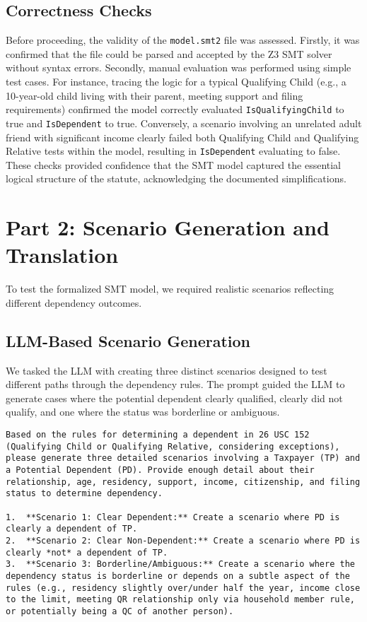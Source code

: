 \documentclass[11pt, letterpaper]{article}
\begin{document}
\subsection{Correctness Checks}
Before proceeding, the validity of the \texttt{model.smt2} file was assessed. Firstly, it was confirmed that the file could be parsed and accepted by the Z3 SMT solver without syntax errors. Secondly, manual evaluation was performed using simple test cases. For instance, tracing the logic for a typical Qualifying Child (e.g., a 10-year-old child living with their parent, meeting support and filing requirements) confirmed the model correctly evaluated \texttt{IsQualifyingChild} to true and \texttt{IsDependent} to true. Conversely, a scenario involving an unrelated adult friend with significant income clearly failed both Qualifying Child and Qualifying Relative tests within the model, resulting in \texttt{IsDependent} evaluating to false. These checks provided confidence that the SMT model captured the essential logical structure of the statute, acknowledging the documented simplifications.

\section{Part 2: Scenario Generation and Translation}

To test the formalized SMT model, we required realistic scenarios reflecting different dependency outcomes.

\subsection{LLM-Based Scenario Generation}

We tasked the LLM with creating three distinct scenarios designed to test different paths through the dependency rules. The prompt guided the LLM to generate cases where the potential dependent clearly qualified, clearly did not qualify, and one where the status was borderline or ambiguous.

\begin{lstlisting}[style=promptstyle, caption={LLM Prompt for Generating Test Scenarios}]
Based on the rules for determining a dependent in 26 USC 152 (Qualifying Child or Qualifying Relative, considering exceptions), please generate three detailed scenarios involving a Taxpayer (TP) and a Potential Dependent (PD). Provide enough detail about their relationship, age, residency, support, income, citizenship, and filing status to determine dependency.

1.  **Scenario 1: Clear Dependent:** Create a scenario where PD is clearly a dependent of TP.
2.  **Scenario 2: Clear Non-Dependent:** Create a scenario where PD is clearly *not* a dependent of TP.
3.  **Scenario 3: Borderline/Ambiguous:** Create a scenario where the dependency status is borderline or depends on a subtle aspect of the rules (e.g., residency slightly over/under half the year, income close to the limit, meeting QR relationship only via household member rule, or potentially being a QC of another person).
\end{lstlisting}
\end{document}
